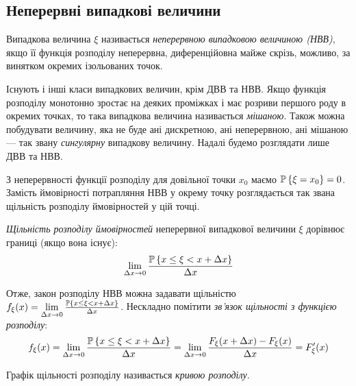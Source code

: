 \subsection{Неперервні випадкові величини}
\begin{definition}
    Випадкова величина $\xi$ називається \emph{неперервною випадковою величиною (НВВ)},
    якщо її функція розподілу неперервна, диференційовна майже скрізь, можливо, за винятком
    окремих ізольованих точок.
\end{definition}
\begin{remark}
    Існують і інші класи випадкових величин, крім ДВВ та НВВ. Якщо функція розподілу
    монотонно зростає на деяких проміжках і має розриви першого роду в окремих точках,
    то така випадкова величина називається \emph{мішаною}. Також можна побудувати величину,
    яка не буде ані дискретною, ані неперервною, ані мішаною --- так звану \emph{сингулярну} випадкову величину.
    Надалі будемо розглядати лише ДВВ та НВВ.
\end{remark}
З неперервності функції розподілу для довільної точки $x_0$ маємо $\P\left\{\xi = x_0\right\} = 0$.
Замість ймовірності потрапляння НВВ у окрему точку розглядається так звана щільність розподілу ймовірностей у цій точці.

\begin{definition}
    \emph{Щільність розподілу ймовірностей} неперервної випадкової величини $\xi$
    дорівнює границі (якщо вона існує):
    \begin{equation}\label{eq:prob_dens}
        \lim_{\Delta x\rightarrow 0} \frac{\P\left\{x\leq \xi < x+\Delta x\right\}}{\Delta x}
    \end{equation}
\end{definition}
Отже, закон розподілу НВВ можна задавати щільністю $f_\xi(x) = \lim\limits_{\Delta x\rightarrow 0} \frac{\P\left\{x\leq \xi < x+\Delta x\right\}}{\Delta x}$.
Нескладно помітити \emph{зв'язок щільності з функцією розподілу}:
\begin{equation}\label{eq:dens_pdf}
    f_\xi(x) = \lim\limits_{\Delta x\rightarrow 0} \frac{\P\left\{x\leq \xi < x+\Delta x\right\}}{\Delta x} = 
    \lim\limits_{\Delta x\rightarrow 0} \frac{F_\xi(x+\Delta x) - F_\xi(x)}{\Delta x} = F'_\xi(x)
\end{equation}
\begin{definition}
    Графік щільності розподілу називається \emph{кривою розподілу}.
\end{definition}

